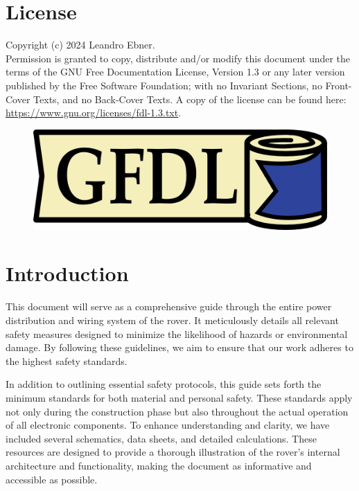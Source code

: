 \section{License}

    Copyright (c)  2024 Leandro Ebner. \\
    Permission is granted to copy, distribute and/or modify this document under the terms of the GNU Free Documentation License, Version 1.3 or any later version published by the Free Software Foundation; with no Invariant Sections, no Front-Cover Texts, and no Back-Cover Texts. A copy of the license can be found here:
    \href{https://www.gnu.org/licenses/fdl-1.3.txt}{https://www.gnu.org/licenses/fdl-1.3.txt}.

    \begin{figure}[h!]
    \includegraphics{contents/figures/gfdl-logo.png}
    \end{figure}
\section{Introduction}

    This document will serve as a comprehensive guide through the entire power distribution and wiring system of the rover. It meticulously details all relevant safety measures designed to minimize the likelihood of hazards or environmental damage. By following these guidelines, we aim to ensure that our work adheres to the highest safety standards. 

    \vspace{5mm}

    In addition to outlining essential safety protocols, this guide sets forth the minimum standards for both material and personal safety. These standards apply not only during the construction phase but also throughout the actual operation of all electronic components. To enhance understanding and clarity, we have included several schematics, data sheets, and detailed calculations. These resources are designed to provide a thorough illustration of the rover's internal architecture and functionality, making the document as informative and accessible as possible.

